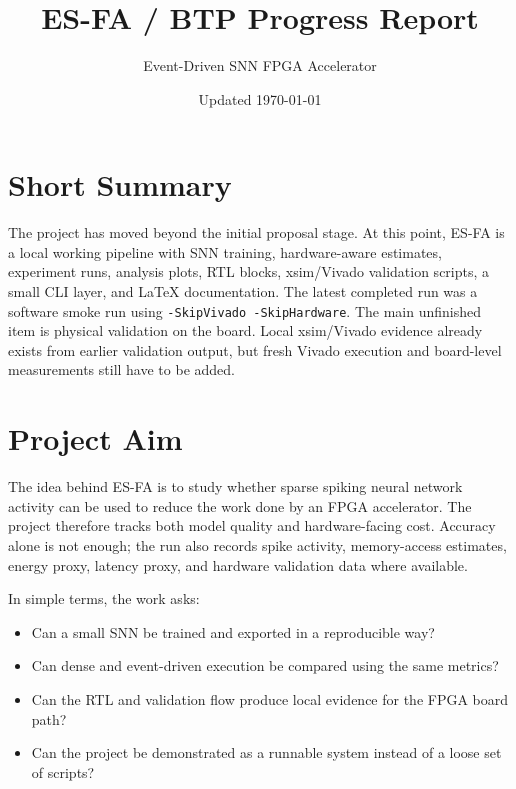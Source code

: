 \documentclass[11pt]{article}
\title{ES-FA / BTP Progress Report}
\author{Event-Driven SNN FPGA Accelerator}
\date{Updated \today}
\begin{document}
\maketitle

\section*{Short Summary}
The project has moved beyond the initial proposal stage. At this point, ES-FA is
a local working pipeline with SNN training, hardware-aware estimates, experiment
runs, analysis plots, RTL blocks, xsim/Vivado validation scripts, a small CLI
layer, and LaTeX documentation. The latest completed run was a software smoke
run using \texttt{-SkipVivado -SkipHardware}. The main unfinished item is
physical validation on the board. Local xsim/Vivado evidence already
exists from earlier validation output, but fresh Vivado execution and board-level
measurements still have to be added.

\section{Project Aim}
The idea behind ES-FA is to study whether sparse spiking neural network activity
can be used to reduce the work done by an FPGA accelerator. The project therefore
tracks both model quality and hardware-facing cost. Accuracy alone is not enough;
the run also records spike activity, memory-access estimates, energy proxy,
latency proxy, and hardware validation data where available.

In simple terms, the work asks:
\begin{itemize}[leftmargin=*]
\item Can a small SNN be trained and exported in a reproducible way?
\item Can dense and event-driven execution be compared using the same metrics?
\item Can the RTL and validation flow produce local evidence for the FPGA board path?
\item Can the project be demonstrated as a runnable system instead of a loose set
of scripts?
\end{itemize}
\end{document}
